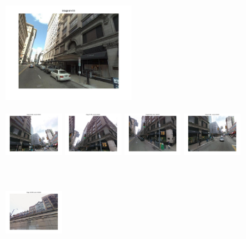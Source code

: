\begin{figure}[h]
\begin{minipage}{0.34\linewidth}
            \centering
            \vspace{0mm}
            \includegraphics[trim = 45mm 40mm 45mm 30mm, clip=true, height=36mm]{imgs/Pval/exMix19/query.jpg}
        \end{minipage}
        \begin{minipage}{0.75\linewidth}
            \begin{minipage}{\linewidth} 
                \colorbox{myRed}{\includegraphics[trim = 35mm 30mm 35mm 30mm, clip=true, height=16mm]{imgs/Pval/exMix19/mixPval01.jpg}}
                \colorbox{myGreen}{\includegraphics[trim = 35mm 30mm 35mm 30mm, clip=true, height=16mm]{imgs/Pval/exMix19/mixPval02.jpg}}
                \colorbox{myGreen}{\includegraphics[trim = 35mm 30mm 35mm 30mm, clip=true, height=16mm]{imgs/Pval/exMix19/mixPval03.jpg}}
                \colorbox{myGreen}{\includegraphics[trim = 35mm 30mm 35mm 30mm, clip=true, height=16mm]{imgs/Pval/exMix19/mixPval04.jpg}}
            \end{minipage}
            \\
            \begin{minipage}{\linewidth}
                \colorbox{myRed}{\includegraphics[trim = 35mm 30mm 35mm 30mm, clip=true, height=16mm]{imgs/Pval/exMix19/mix01.jpg}}

\end{minipage}
\end{minipage}
\end{figure}
